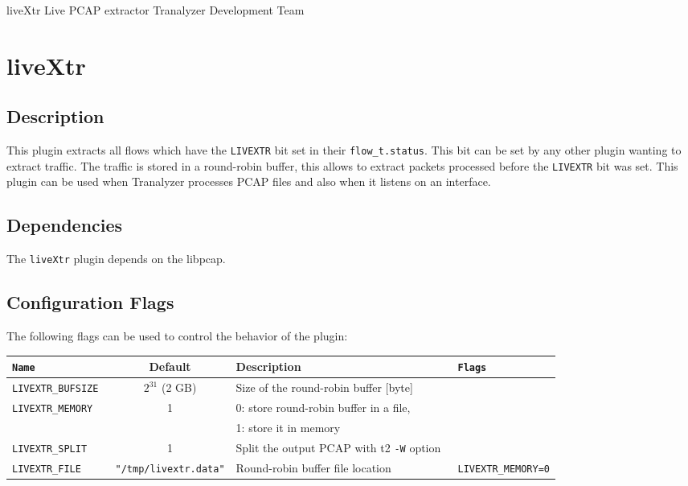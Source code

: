 \documentclass[documentation]{subfiles}
\begin{document}
\trantitle
    {liveXtr} %
    {Live PCAP extractor} %
    {Tranalyzer Development Team} %

\section{liveXtr}\label{s:liveXtr}

\subsection{Description}
This plugin extracts all flows which have the {\tt LIVEXTR} bit set in their
{\tt flow\_t.status}. This bit can be set by any other plugin wanting to extract traffic.
The traffic is stored in a round-robin buffer, this allows to extract packets processed before
the {\tt LIVEXTR} bit was set. This plugin can be used when Tranalyzer processes PCAP files and
also when it listens on an interface.

\subsection{Dependencies}

The {\tt liveXtr} plugin depends on the libpcap.


\subsection{Configuration Flags}
The following flags can be used to control the behavior of the plugin:
\begin{longtable}{>{\tt}lcl>{\tt\small}l}
    \toprule
    {\bf Name} & {\bf Default} & {\bf Description} & {\bf Flags}\\
    \midrule\endhead%
    LIVEXTR\_BUFSIZE & $2^{31}$ (2 GB)                 & Size of the round-robin buffer [byte]         & \\
    LIVEXTR\_MEMORY  & 1                               & 0: store round-robin buffer in a file,        & \\
                     &                                 & 1: store it in memory                         & \\
    LIVEXTR\_SPLIT   & 1                               & Split the output PCAP with t2 {\tt -W} option & \\
    LIVEXTR\_FILE    & {\tt\small "/tmp/livextr.data"} & Round-robin buffer file location              & LIVEXTR\_MEMORY=0\\
    \bottomrule
\end{longtable}
\end{document}
